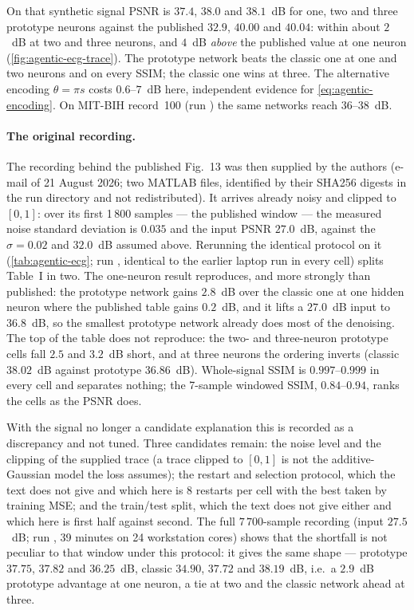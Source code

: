 On that synthetic signal PSNR is $37.4$, $38.0$ and $38.1$~dB for one, two and three prototype
neurons against the published $32.9$, $40.00$ and $40.04$: within about $2$~dB at two and three
neurons, and $4$~dB \emph{above} the published value at one neuron
(\cref{fig:agentic-ecg-trace}).  The prototype network beats the classic one at one and two
neurons and on every SSIM; the classic one wins at three.  The alternative encoding
$\theta=\pi s$ costs $0.6$--$7$~dB here, independent evidence for \cref{eq:agentic-encoding}.
On MIT-BIH record~100 (run ) the same networks reach $36$--$38$~dB.

\paragraph{The original recording.}
The recording behind the published Fig.~13 was then supplied by the authors (e-mail of
21 August 2026; two MATLAB files, identified by their SHA256 digests in the run directory and
not redistributed).  It arrives already noisy and clipped to $[0,1]$: over its first 1\,800
samples --- the published window --- the measured noise standard deviation is $0.035$ and the
input PSNR $27.0$~dB, against the $\sigma=0.02$ and $32.0$~dB assumed above.  Rerunning the
identical protocol on it (\cref{tab:agentic-ecg}; run ,
identical to the earlier laptop run  in every cell) splits Table~I in
two.  The one-neuron result reproduces, and more strongly
than published: the prototype network gains $2.8$~dB over the classic one at one hidden neuron
where the published table gains $0.2$~dB, and it lifts a $27.0$~dB input to $36.8$~dB, so the
smallest prototype network already does most of the denoising.  The top of the table does not
reproduce: the two- and three-neuron prototype cells fall $2.5$ and $3.2$~dB short, and at three
neurons the ordering inverts (classic $38.02$~dB against prototype $36.86$~dB).  Whole-signal
SSIM is $0.997$--$0.999$ in every cell and separates nothing; the 7-sample windowed SSIM,
$0.84$--$0.94$, ranks the cells as the PSNR does.

With the signal no longer a candidate explanation this is recorded as a discrepancy and not
tuned.  Three candidates remain: the noise level and the clipping of the supplied trace (a trace
clipped to $[0,1]$ is not the additive-Gaussian model the loss assumes); the restart and
selection protocol, which the text does not give and which here is 8 restarts per cell with the
best taken by training MSE; and the train/test split, which the text does not give either and
which here is first half against second.  The full $7\,700$-sample recording (input
$27.5$~dB; run , 39 minutes on 24 workstation cores)
shows that the shortfall is not peculiar to that window under this protocol: it gives the same shape --- prototype $37.75$, $37.82$ and
$36.25$~dB, classic $34.90$, $37.72$ and $38.19$~dB, i.e.\ a $2.9$~dB prototype advantage at one
neuron, a tie at two and the classic network ahead at three.

